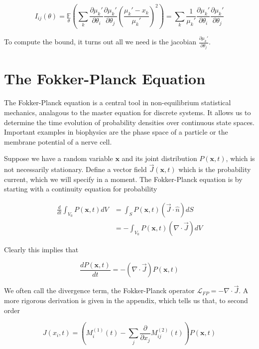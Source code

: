 \begin{equation*}
I_{ij}(\theta) = \underset{\theta}{\mathbb{E}}\left(\sum_{k}\frac{\partial \mu_{k}'}{\partial\theta_{i}}\frac{\partial \mu_{k}'}{\partial\theta_{j}} \left(\frac{\mu_{k}'-x_{k}}{\mu_{k}'}\right)^{2}\right) = \sum_{k}\frac{1}{\mu_{k}'}\frac{\partial \mu_{k}'}{\partial\theta_{i}}\frac{\partial \mu_{k}'}{\partial\theta_{j}}
\end{equation*}

To compute the bound, it turns out all we need is the jacobian $\frac{\partial \mu_{k}'}{\partial\theta_{j}} $.

\section{The Fokker-Planck Equation}

The Fokker-Planck equation is a central tool in non-equilibrium statistical mechanics, analagous to the master equation for discrete systems. It allows us to determine the time evolution of probability densities over continuous state spaces. Important examples in biophysics are the phase space of a particle or the membrane potential of a nerve cell.

Suppose we have a random variable $\bm{x}$ and its joint distribution $P(\bm{x},t)$, which is not necessarily stationary. Define a vector field $\vec{J}(\bm{x},t)$ which is the probability current, which we will specify in a moment. The Fokker-Planck equation is by starting with a continuity equation for probability 

\begin{align*}
\frac{d}{dt}\int_{V_{0}} P(\bm{x},t)dV &= \int_{S}P(\bm{x},t)(\vec{J}\cdot\hat{n})dS\\
&= -\int_{V_{0}}P(\bm{x},t)(\nabla\cdot \vec{J})dV
\end{align*}

Clearly this implies that

\begin{equation*}
\frac{dP(\bm{x},t)}{dt} = -\left(\nabla\cdot \vec{J}\right)P(\bm{x},t)
\end{equation*}

We often call the divergence term, the Fokker-Planck operator $\mathcal{L}_{FP}=-\nabla\cdot \vec{J}$. A more rigorous derivation is given in the appendix, which tells us that, to second order

\begin{equation*}
J(x_{i},t)  = \left(M_{i}^{(1)}(t) - \sum_{j}\frac{\partial}{\partial x_{j}}M_{ij}^{(2)}(t) \right)P(\bm{x},t)
\end{equation*}

